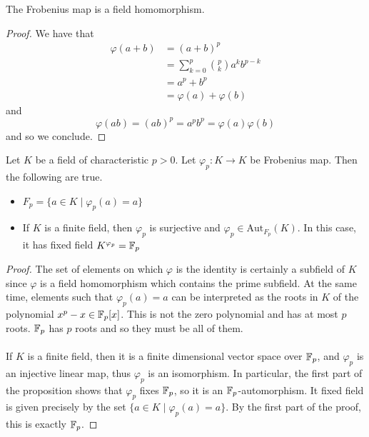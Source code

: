 \documentclass[a4paper]{article}
\begin{document}
\begin{lmm}{}{} The Frobenius map is a field homomorphism. \tcbline
\begin{proof}
We have that 
\begin{align*}
\varphi(a+b)&=(a+b)^p\\
&=\sum_{k=0}^p\binom{p}{k}a^kb^{p-k}\\
&=a^p+b^p\\
&=\varphi(a)+\varphi(b)
\end{align*}
and $$\varphi(ab)=(ab)^p=a^pb^p=\varphi(a)\varphi(b)$$ and so we conclude. 
\end{proof}
\end{lmm}

\begin{prp}{}{} Let $K$ be a field of characteristic $p>0$. Let $\varphi_p:K\to K$ be Frobenius map. Then the following are true. 
\begin{itemize}
\item $F_p=\{a\in K\;|\;\varphi_p(a)=a\}$
\item If $K$ is a finite field, then $\varphi_p$ is surjective and $\varphi_p\in\text{Aut}_{F_p}(K)$. In this case, it has fixed field $K^{\varphi_p}=\mathbb{F}_p$
\end{itemize} \tcbline
\begin{proof}
The set of elements on which $\varphi$ is the identity is certainly a subfield of $K$ since $\varphi$ is a field homomorphism which contains the prime subfield. At the same time, elements such that $\varphi_p(a)=a$ can be interpreted as the roots in $K$ of the polynomial $x^p-x\in\mathbb{F}_p[x]$. This is not the zero polynomial and has at most $p$ roots. $\mathbb{F}_p$ has $p$ roots and so they must be all of them. \\~\\

If $K$ is a finite field, then it is a finite dimensional vector space over $\mathbb{F}_p$, and $\varphi_p$ is an injective linear map, thus $\varphi_p$ is an isomorphism. In particular, the first part of the proposition shows that $\varphi_p$ fixes $\mathbb{F}_p$, so it is an $\mathbb{F}_p$-automorphism. It fixed field is given precisely by the set $\{a\in K\;|\;\varphi_p(a)=a\}$. By the first part of the proof, this is exactly $\mathbb{F}_p$. 
\end{proof}
\end{prp}
\end{document}
